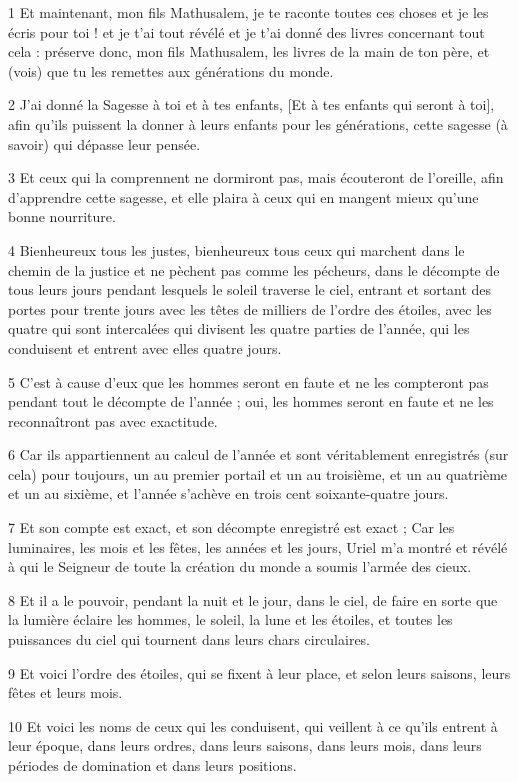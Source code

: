 \par 1 Et maintenant, mon fils Mathusalem, je te raconte toutes ces choses et je les écris pour toi ! et je t'ai tout révélé et je t'ai donné des livres concernant tout cela : préserve donc, mon fils Mathusalem, les livres de la main de ton père, et (vois) que tu les remettes aux générations du monde.
\par 2 J'ai donné la Sagesse à toi et à tes enfants, [Et à tes enfants qui seront à toi], afin qu'ils puissent la donner à leurs enfants pour les générations, cette sagesse (à savoir) qui dépasse leur pensée.
\par 3 Et ceux qui la comprennent ne dormiront pas, mais écouteront de l'oreille, afin d'apprendre cette sagesse, et elle plaira à ceux qui en mangent mieux qu'une bonne nourriture.
\par 4 Bienheureux tous les justes, bienheureux tous ceux qui marchent dans le chemin de la justice et ne pèchent pas comme les pécheurs, dans le décompte de tous leurs jours pendant lesquels le soleil traverse le ciel, entrant et sortant des portes pour trente jours avec les têtes de milliers de l'ordre des étoiles, avec les quatre qui sont intercalées qui divisent les quatre parties de l'année, qui les conduisent et entrent avec elles quatre jours.
\par 5 C'est à cause d'eux que les hommes seront en faute et ne les compteront pas pendant tout le décompte de l'année ; oui, les hommes seront en faute et ne les reconnaîtront pas avec exactitude.
\par 6 Car ils appartiennent au calcul de l'année et sont véritablement enregistrés (sur cela) pour toujours, un au premier portail et un au troisième, et un au quatrième et un au sixième, et l'année s'achève en trois cent soixante-quatre jours.
\par 7 Et son compte est exact, et son décompte enregistré est exact ; Car les luminaires, les mois et les fêtes, les années et les jours, Uriel m'a montré et révélé à qui le Seigneur de toute la création du monde a soumis l'armée des cieux.
\par 8 Et il a le pouvoir, pendant la nuit et le jour, dans le ciel, de faire en sorte que la lumière éclaire les hommes, le soleil, la lune et les étoiles, et toutes les puissances du ciel qui tournent dans leurs chars circulaires.
\par 9 Et voici l'ordre des étoiles, qui se fixent à leur place, et selon leurs saisons, leurs fêtes et leurs mois.
\par 10 Et voici les noms de ceux qui les conduisent, qui veillent à ce qu'ils entrent à leur époque, dans leurs ordres, dans leurs saisons, dans leurs mois, dans leurs périodes de domination et dans leurs positions.
